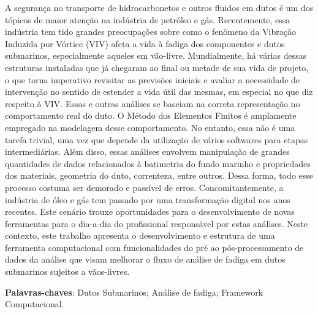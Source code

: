 
\setlength{\absparsep}{18pt} %
\begin{resumo}

    A segurança no transporte de hidrocarbonetos e outros fluidos em dutos é um dos tópicos de maior atenção na indústria de petróleo e gás.
    Recentemente, essa indústria tem tido grandes preocupações sobre como o fenômeno da Vibração Induzida por Vórtice (VIV) afeta a vida à fadiga dos componentes e dutos submarinos, especialmente aqueles em vão-livre. %
    Mundialmente, há várias dessas estruturas instaladas que já chegaram ao final ou metade de sua vida de projeto, o que torna imperativo revisitar as previsões iniciais e avaliar a necessidade de intervenção no sentido de estender a vida útil das mesmas, em especial no que diz respeito à VIV.
    Essas e outras análises se baseiam na correta representação no comportamento real do duto.
    O Método dos Elementos Finitos é amplamente empregado na modelagem desse comportamento.
    No entanto, essa não é uma tarefa trivial, uma vez que depende da utilização de vários softwares para etapas intermediárias.
    Além disso, essas análises envolvem manipulação de grandes quantidades de dados relacionados à batimetria do fundo marinho e propriedades dos materiais, geometria do duto, correnteza, entre outros.
    Dessa forma, todo esse processo costuma ser demorado e passível de erros.
    Concomitantemente, a indústria de óleo e gás tem passado por uma transformação digital nos anos recentes.
    Este cenário trouxe oportunidades para o desenvolvimento de novas ferramentas para o dia-a-dia do profissional responsável por estas análises.
    Neste contexto, este trabalho apresenta o desenvolvimento e estrutura de uma ferramenta computacional com funcionalidades do pré ao pós-processamento de dados da análise que visam melhorar o fluxo de análise de fadiga em dutos submarinos sujeitos a vãos-livres.

 \textbf{Palavras-chaves}: Dutos Submarinos; Análise de fadiga; Framework Computacional.
\end{resumo}


